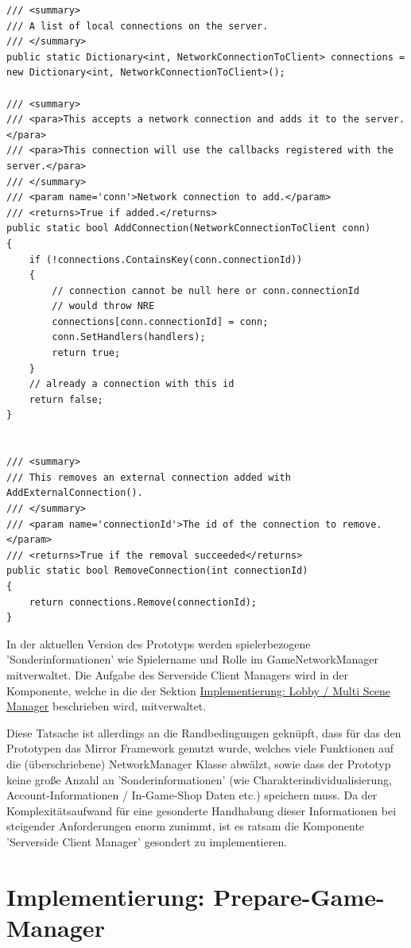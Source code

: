 \begin{lstlisting}[caption= Mirror Class NetworkServer.cs Connection Handling]
/// <summary>
/// A list of local connections on the server.
/// </summary>
public static Dictionary<int, NetworkConnectionToClient> connections = new Dictionary<int, NetworkConnectionToClient>();

/// <summary>
/// <para>This accepts a network connection and adds it to the server.</para>
/// <para>This connection will use the callbacks registered with the server.</para>
/// </summary>
/// <param name='conn'>Network connection to add.</param>
/// <returns>True if added.</returns>
public static bool AddConnection(NetworkConnectionToClient conn)
{
	if (!connections.ContainsKey(conn.connectionId))
	{
		// connection cannot be null here or conn.connectionId
		// would throw NRE
		connections[conn.connectionId] = conn;
		conn.SetHandlers(handlers);
		return true;
	}
	// already a connection with this id
	return false;
}


/// <summary>
/// This removes an external connection added with AddExternalConnection().
/// </summary>
/// <param name='connectionId'>The id of the connection to remove.</param>
/// <returns>True if the removal succeeded</returns>
public static bool RemoveConnection(int connectionId)
{
	return connections.Remove(connectionId);
}
\end{lstlisting}

In der aktuellen Version des Prototyps werden spielerbezogene 'Sonderinformationen' wie Spielername und Rolle im GameNetworkManager  mitverwaltet. Die Aufgabe des Serverside Client Managers wird in der Komponente, welche in die der Sektion \hyperref[Lobby Manager Implementierung]{Implementierung: Lobby / Multi Scene Manager} beschrieben wird, mitverwaltet. 

Diese Tatsache ist allerdings an die Randbedingungen geknüpft, dass für das den Prototypen das Mirror Framework genutzt wurde, welches viele Funktionen auf die (überschriebene) NetworkManager Klasse abwälzt, sowie dass der Prototyp keine große Anzahl an 'Sonderinformationen' (wie Charakterindividualisierung, Account-Informationen / In-Game-Shop Daten etc.) speichern muss. Da der Komplexitätsaufwand für eine gesonderte Handhabung dieser Informationen bei steigender Anforderungen enorm zunimmt, ist es ratsam die Komponente 'Serverside Client Manager' gesondert zu implementieren.

\section{Implementierung: Prepare-Game-Manager}
\label{Implementierung:prepare_game_manager}

